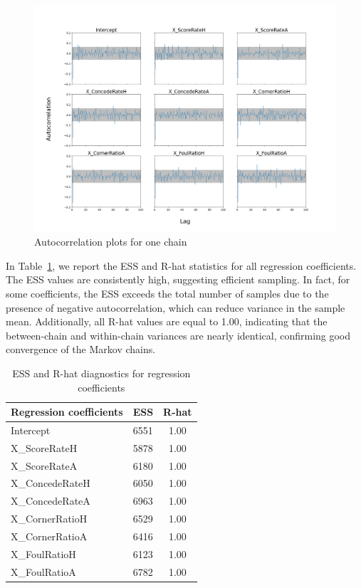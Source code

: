 \documentclass[9pt]{IEEEtran}
\begin{document}
\begin{figure}[h]
\centering
\includegraphics[width=1\columnwidth]{figures/autocorr.png}
\caption{Autocorrelation plots for one chain}
\label{fig:autocorr}
\end{figure}

In Table~\ref{tab:ess_rhat}, we report the ESS and R-hat statistics 
for all regression coefficients. The ESS values are consistently high, 
suggesting efficient sampling. In fact, for some coefficients, the 
ESS exceeds the total number of samples due to the presence of 
negative autocorrelation, which can reduce variance in the sample mean. 
Additionally, all R-hat values are equal to 1.00, indicating that the
 between-chain and within-chain variances are nearly identical, 
 confirming good convergence of the Markov chains.

\begin{table}[ht]
\centering
\begin{tabular}{l|c|c}
\textbf{Regression coefficients} & \textbf{ESS} & \textbf{R-hat} \\
\hline
Intercept        & 6551 & 1.00 \\
X\_ScoreRateH    & 5878 & 1.00 \\
X\_ScoreRateA    & 6180 & 1.00 \\
X\_ConcedeRateH  & 6050 & 1.00 \\
X\_ConcedeRateA  & 6963 & 1.00 \\
X\_CornerRatioH  & 6529 & 1.00 \\
X\_CornerRatioA  & 6416 & 1.00 \\
X\_FoulRatioH    & 6123 & 1.00 \\
X\_FoulRatioA    & 6782 & 1.00 \\
\end{tabular}
\caption{ESS and R-hat diagnostics for regression coefficients}
\label{tab:ess_rhat}
\end{table}
\end{document}
